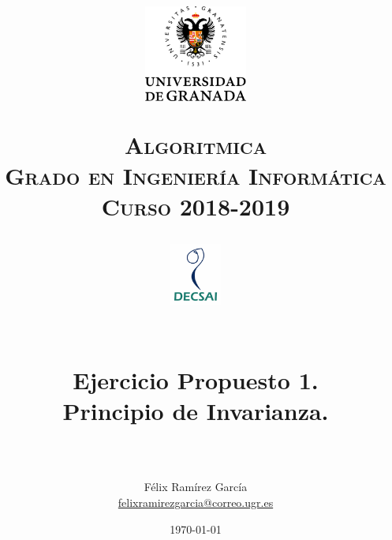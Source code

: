 
\usepackage{url}

\title{	
	\normalfont \normalsize
	\begin{figure}[htb]
		\centering
		\includegraphics[width=0.3\textwidth]{./imagenes/1}
	\end{figure}
	\textsc{\textbf{Algoritmica} \\ Grado en Ingeniería Informática \\ 
	Curso 2018-2019} \\ [25pt] 
	\begin{figure}[htb]
		\centering
		\includegraphics[width=0.15\textwidth]{./imagenes/2}
	\end{figure}
	\horrule{0.5pt} \\[0.4cm]
	\huge Ejercicio Propuesto 1. \\
	\huge Principio de Invarianza.
	\\ 
	\horrule{2pt} \\[0.5cm] 
}
\author{Félix Ramírez García  \\
\href{mailto:felixramirezgarcia@correo.ugr.es}{felixramirezgarcia@correo.ugr.es}}
\date{\normalsize\today} 



	
	\maketitle %
	
	\newpage %
	
	\tableofcontents %
	
	\listoffigures %
	
